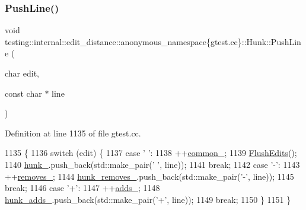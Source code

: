 \subsubsection{\texorpdfstring{Push\+Line()}{PushLine()}}
{\footnotesize\ttfamily void testing\+::internal\+::edit\+\_\+distance\+::anonymous\+\_\+namespace\{gtest.\+cc\}\+::Hunk\+::\+Push\+Line (\begin{DoxyParamCaption}\item[{char}]{edit,  }\item[{const char $\ast$}]{line }\end{DoxyParamCaption})\hspace{0.3cm}{\ttfamily [inline]}}



Definition at line 1135 of file gtest.\+cc.


\begin{DoxyCode}
1135                                              \{
1136     \textcolor{keywordflow}{switch} (edit) \{
1137       \textcolor{keywordflow}{case} \textcolor{charliteral}{' '}:
1138         ++\hyperlink{classtesting_1_1internal_1_1edit__distance_1_1anonymous__namespace_02gtest_8cc_03_1_1Hunk_a027909c2722c8549d8ca490ffa14b134}{common\_};
1139         \hyperlink{classtesting_1_1internal_1_1edit__distance_1_1anonymous__namespace_02gtest_8cc_03_1_1Hunk_a8279c19ffd74766256c2aec97cd25378}{FlushEdits}();
1140         \hyperlink{classtesting_1_1internal_1_1edit__distance_1_1anonymous__namespace_02gtest_8cc_03_1_1Hunk_a212b858a6076f325fd6544dd35290761}{hunk\_}.push\_back(std::make\_pair(\textcolor{charliteral}{' '}, line));
1141         \textcolor{keywordflow}{break};
1142       \textcolor{keywordflow}{case} \textcolor{charliteral}{'-'}:
1143         ++\hyperlink{classtesting_1_1internal_1_1edit__distance_1_1anonymous__namespace_02gtest_8cc_03_1_1Hunk_afef2d4c5c0b9cb9567d4f778f6748828}{removes\_};
1144         \hyperlink{classtesting_1_1internal_1_1edit__distance_1_1anonymous__namespace_02gtest_8cc_03_1_1Hunk_ad0fcc5e7b40f3dc29372ab5393efcb1f}{hunk\_removes\_}.push\_back(std::make\_pair(\textcolor{charliteral}{'-'}, line));
1145         \textcolor{keywordflow}{break};
1146       \textcolor{keywordflow}{case} \textcolor{charliteral}{'+'}:
1147         ++\hyperlink{classtesting_1_1internal_1_1edit__distance_1_1anonymous__namespace_02gtest_8cc_03_1_1Hunk_aebe5a95d3f4d959662f95e4d6b759c87}{adds\_};
1148         \hyperlink{classtesting_1_1internal_1_1edit__distance_1_1anonymous__namespace_02gtest_8cc_03_1_1Hunk_aec370e5d76c490b9dd99fbe8f15f66e1}{hunk\_adds\_}.push\_back(std::make\_pair(\textcolor{charliteral}{'+'}, line));
1149         \textcolor{keywordflow}{break};
1150     \}
1151   \}
\end{DoxyCode}


